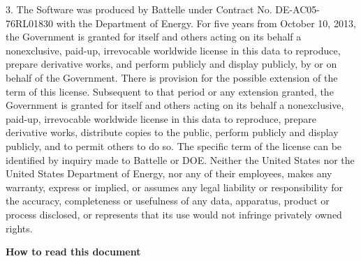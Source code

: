 \documentclass[12pt]{report} %
\begin{document}
3.      The Software was produced by Battelle under Contract No. DE-AC05-76RL01830 with the Department of Energy.  For five  years from October 10, 2013, the Government is granted for itself and others acting on its behalf a nonexclusive, paid-up, irrevocable worldwide license in this data to reproduce, prepare derivative works, and perform publicly and display publicly, by or on behalf of the Government.  There is provision for the possible extension of the term of this license.  Subsequent to that period or any extension granted, the Government is granted for itself and others acting on its behalf a nonexclusive, paid-up, irrevocable worldwide license in this data to reproduce, prepare derivative works, distribute copies to the public, perform publicly and display publicly, and to permit others to do  so.  The specific term of the license can be identified by inquiry made to Battelle or DOE.  Neither the United States nor the United States Department of Energy, nor any of their employees, makes any warranty, express or implied, or assumes any legal liability or responsibility for the accuracy, completeness or usefulness of any data, apparatus, product or process disclosed, or represents that its use would not infringe privately owned rights.


\tableofcontents
\eject


\textbf{How to read this document}
\end{document}
